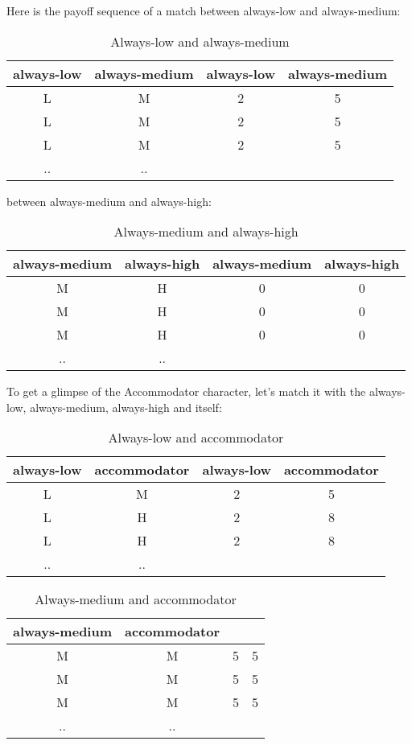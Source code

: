 \documentclass[12.5pt]{report}
\begin{document}
Here is the payoff sequence of a match between always-low and always-medium:
\begin{table}[h!]
\center
\begin{tabular}{cc|cc}
always-low & always-medium & always-low & always-medium\\
\hline
L & M & 2 & 5 \\
L & M & 2 & 5 \\
L & M & 2 & 5 \\
.. & ..\\
\end{tabular}
\caption{Always-low and always-medium}
\end{table}

between always-medium and always-high:
\begin{table}[h!]
\center
\begin{tabular}{cc|cc}
always-medium & always-high & always-medium & always-high\\
\hline
M & H & 0 & 0 \\
M & H & 0 & 0 \\
M & H & 0 & 0 \\
.. & ..\\
\end{tabular}
\caption{Always-medium and always-high}
\end{table}


To get a glimpse of the Accommodator character, let's match it with the always-low, always-medium, always-high and itself:

\begin{table}[h!]
\center
\begin{tabular}{cc|cc}
always-low & accommodator & always-low & accommodator\\
\hline
L & M & 2 & 5 \\
L & H & 2 & 8 \\
L & H & 2 & 8 \\
.. & ..\\
\end{tabular}
\caption{Always-low and accommodator}
\end{table}

\begin{table}[h!]
\center
\begin{tabular}{cc|cc}
always-medium & accommodator & & \\
\hline
M & M & 5 & 5 \\
M & M & 5 & 5 \\
M & M & 5 & 5 \\
.. & ..\\
\end{tabular}
\caption{Always-medium and accommodator}
\end{table}
\end{document}

